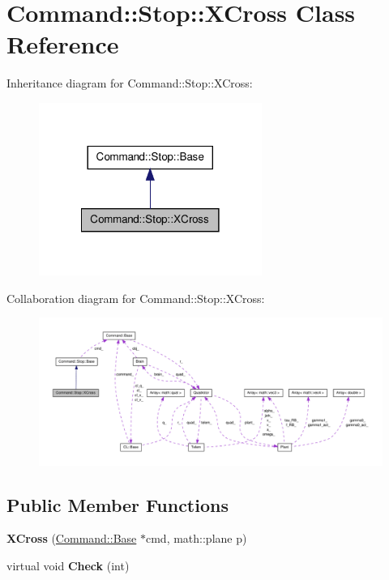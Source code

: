 \hypertarget{classCommand_1_1Stop_1_1XCross}{\section{\-Command\-:\-:\-Stop\-:\-:\-X\-Cross \-Class \-Reference}
\label{classCommand_1_1Stop_1_1XCross}
}


\-Inheritance diagram for \-Command\-:\-:\-Stop\-:\-:\-X\-Cross\-:\nopagebreak
\begin{figure}[H]
\begin{center}
\leavevmode
\includegraphics[width=206pt]{classCommand_1_1Stop_1_1XCross__inherit__graph}
\end{center}
\end{figure}


\-Collaboration diagram for \-Command\-:\-:\-Stop\-:\-:\-X\-Cross\-:\nopagebreak
\begin{figure}[H]
\begin{center}
\leavevmode
\includegraphics[width=350pt]{classCommand_1_1Stop_1_1XCross__coll__graph}
\end{center}
\end{figure}
\subsection*{\-Public \-Member \-Functions}
\begin{DoxyCompactItemize}
\item 
\hypertarget{classCommand_1_1Stop_1_1XCross_a9019aea486d803956c223ffca0df2a4c}{{\bfseries \-X\-Cross} (\hyperlink{classCommand_1_1Base}{\-Command\-::\-Base} $\ast$cmd, math\-::plane p)}\label{classCommand_1_1Stop_1_1XCross_a9019aea486d803956c223ffca0df2a4c}

\item 
\hypertarget{classCommand_1_1Stop_1_1XCross_afd4251c9153c934f2c8c194f92a5dcdb}{virtual void {\bfseries \-Check} (int)}\label{classCommand_1_1Stop_1_1XCross_afd4251c9153c934f2c8c194f92a5dcdb}

\end{DoxyCompactItemize}
